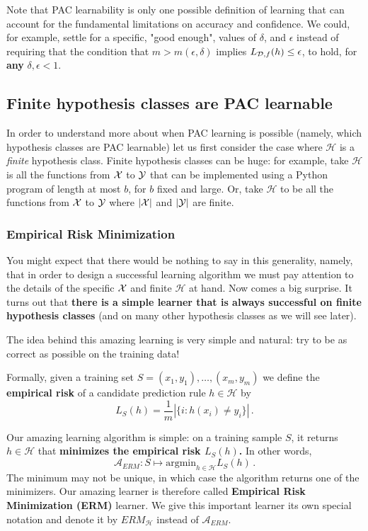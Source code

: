 \documentclass[11pt]{article}
\newcommand{\Ac}{\mathcal{A}}
\newcommand{\Hc}{\mathcal{H}}
\begin{document}
Note that  PAC learnability is only one possible definition of learning that can account for the fundamental limitations on accuracy and confidence. We could, for example, settle for a specific, "good enough", values of $\delta$,  and $\epsilon$ instead of requiring that the condition that $m > m(\epsilon, \delta)$ implies  $L_{\mathcal{D}, f}(h) \le \epsilon$, to hold, for {\bf any} $\delta, \epsilon <1$.

\subsection{Finite hypothesis classes are PAC learnable}

In order to understand more about when PAC learning is possible (namely, which hypothesis classes are PAC learnable) let us first consider the case where $\Hc$ is a \textit{finite} hypothesis class.
Finite hypothesis classes can be huge: for example, take $\Hc$ is all the functions from $\mathcal{X}$ to $\mathcal{Y}$ that can be implemented using a Python program of length at most $b$, for $b$ fixed and large. Or, take $\Hc$ to be all the functions from $\mathcal{X}$ to $\mathcal{Y}$ where  $|\mathcal{X}|$ and $|\mathcal{Y}|$ are finite.

\subsubsection{Empirical Risk Minimization}

You might expect that there would be nothing to say in this generality, namely,
that in order to design a successful learning algorithm we must pay attention to
the details of the specific $\mathcal{X}$ and finite $\Hc$ at hand.
Now comes a big surprise. It turns out that {\bf there is a simple learner that is always successful on finite hypothesis classes} (and on many other hypothesis classes as we will see later).

The idea behind this amazing learning is very simple and natural: try to be as correct as possible on the training data!

Formally, given  a training set $S = (x_1,y_1),\ldots,(x_m,y_m)$ we define the {\bf empirical risk} of a candidate prediction rule $h\in\Hc$ by
$$L_S(h) = \frac{1}{m} |\{i : h(x_i)  \neq y_i\}|\,.$$

Our amazing learning algorithm is simple: on a training sample $S$, it returns $h \in \Hc$ that {\bf minimizes the empirical risk $L_S(h)$.} In other words,
\[
\Ac_{ERM} : S \mapsto \text{argmin}_{h\in\Hc} L_S(h)\,.
\]
The minimum may not be unique, in which case the algorithm returns one of the
minimizers. Our amazing learner is therefore called \textbf{Empirical Risk
Minimization (ERM)} learner. We give this important learner its own special
notation and denote it by $ERM_\Hc$ instead of $\Ac_{ERM}$.
\end{document}
